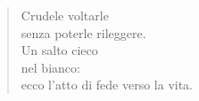 
\begin{verse}
    Crudele voltarle\\
    senza poterle rileggere.\\
    Un salto cieco\\
    nel bianco:\\
    ecco l'atto di fede verso la vita.
\end{verse}